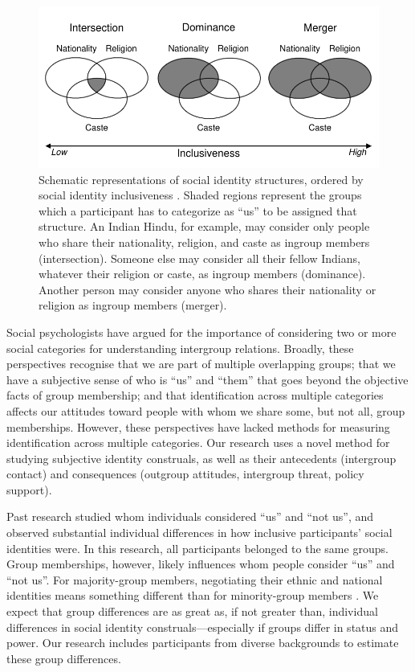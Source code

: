 \documentclass[12pt, a4paper]{article}
\begin{document}
\begin{figure}
\centering
\includegraphics[scale=1]{../figures/figure-1}
\caption{
Schematic representations of social identity structures, ordered by social identity inclusiveness \protect{}. Shaded regions represent the groups which a participant has to categorize as ``us'' to be assigned that structure. An Indian Hindu, for example, may consider only people who share their nationality, religion, and caste as ingroup members (intersection). Someone else may consider all their fellow Indians, whatever their religion or caste, as ingroup members (dominance). Another person may consider anyone who shares their nationality or religion as ingroup members (merger).
}
\label{fig:f1}
\end{figure}

Social psychologists have argued for the importance of considering two \cite{berry_immigration_1997, crisp_multiple_2007, dovidio_commonality_2009} or more \cite{roccas_social_2002} social categories for understanding intergroup relations. Broadly, these perspectives recognise that we are part of multiple overlapping groups; that we have a subjective sense of who is ``us'' and ``them'' that goes beyond the objective facts of group membership; and that identification across multiple categories affects our attitudes toward people with whom we share some, but not all, group memberships. However, these perspectives have lacked methods for measuring identification across multiple categories. Our research uses a novel method for studying subjective identity construals, as well as their antecedents (intergroup contact) and consequences (outgroup attitudes, intergroup threat, policy support).

Past research  studied whom individuals considered ``us'' and ``not us'', and observed substantial individual differences in how inclusive participants' social identities were. In this research, all participants belonged to the same groups. Group memberships, however, likely influences whom people consider ``us'' and ``not us''. For majority-group members, negotiating their ethnic and national identities means something different than for minority-group members \cite{dovidio_commonality_2009}. We expect that group differences are as great as, if not greater than, individual differences in social identity construals---especially if groups differ in status and power. Our research includes participants from diverse backgrounds to estimate these group differences.
\end{document}
